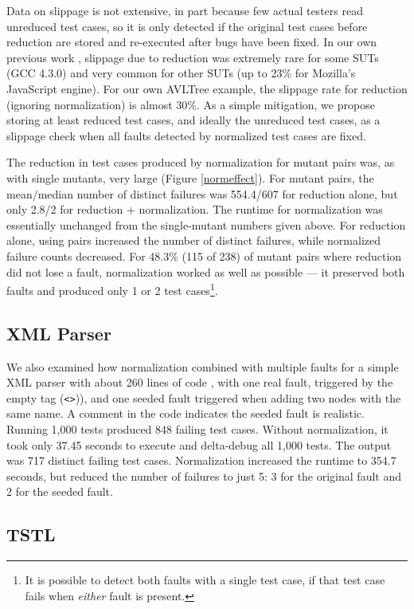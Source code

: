 Data on slippage is not extensive, in part because few actual testers
read unreduced test cases, so it is only detected if the original test
cases before reduction are stored and re-executed after bugs have been
fixed.  In our own previous work \cite{PLDI13}, slippage due to
reduction was extremely rare for some SUTs (GCC 4.3.0) and very common
for other SUTs (up to 23\% for Mozilla's JavaScript engine).  For our
own AVLTree example, the slippage rate for reduction (ignoring
normalization) is almost 30\%.  As a simple mitigation, we propose
storing at least reduced test cases, and ideally the unreduced test
cases, as a slippage check when all faults detected by normalized test
cases are fixed.

The reduction in test cases produced by normalization for mutant pairs
was, as with single mutants, very large (Figure \ref{normeffect}).
For mutant pairs, the mean/median number of distinct failures was
554.4/607 for reduction alone, but only 2.8/2 for reduction +
normalization.  The runtime for normalization was essentially
unchanged from the single-mutant numbers given above.  For reduction
alone, using pairs increased the number of distinct failures, while
normalized failure counts decreased.  For 48.3\% (115 of 238) of
mutant pairs where reduction did not lose a fault, normalization
worked as well as possible --- it preserved both faults and produced only 1 or 2 test
cases\footnote{It is possible to detect both faults with a single test
  case, if that test case fails when \emph{either} fault is present.}.

\subsection{XML Parser}

We also examined how normalization combined with multiple faults for a
simple XML parser with about 260 lines of code \cite{myxml}, with one
real fault, triggered by the empty tag ({\tt <>})), and one
seeded fault triggered when adding two nodes with the same
name.  A comment in the code indicates the seeded fault is realistic.  Running 1,000 tests
produced 848 failing test cases.  Without normalization, it took only
37.45 seconds to execute and delta-debug all 1,000 tests.  The output was 717 distinct failing test
cases.  Normalization increased the runtime to 354.7 seconds, but
reduced the number of failures to just 5: 3 
for the original fault and 2 for the seeded fault.


\subsection{TSTL}

